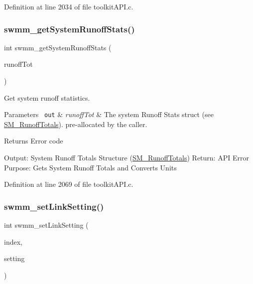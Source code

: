 Definition at line 2034 of file toolkit\+A\+P\+I.\+c.

\mbox{\label{group__tkfuncs_gabf3ea290e2af763289e18db435ea2ccd}} 
\subsubsection{\texorpdfstring{swmm\_getSystemRunoffStats()}{swmm\_getSystemRunoffStats()}}
{\footnotesize\ttfamily int swmm\+\_\+get\+System\+Runoff\+Stats (\begin{DoxyParamCaption}\item[{\mbox{\hyperlink{struct_s_m___runoff_totals}{S\+M\+\_\+\+Runoff\+Totals}} $\ast$}]{runoff\+Tot }\end{DoxyParamCaption})}



Get system runoff statistics. 


\begin{DoxyParams}[1]{Parameters}
\mbox{\texttt{ out}}  & {\em runoff\+Tot} & The system Runoff Stats struct (see \mbox{\hyperlink{struct_s_m___runoff_totals}{S\+M\+\_\+\+Runoff\+Totals}}). pre-\/allocated by the caller. \\
\hline
\end{DoxyParams}
\begin{DoxyReturn}{Returns}
Error code
\end{DoxyReturn}
Output\+: System Runoff Totals Structure (\mbox{\hyperlink{struct_s_m___runoff_totals}{S\+M\+\_\+\+Runoff\+Totals}}) Return\+: A\+PI Error Purpose\+: Gets System Runoff Totals and Converts Units 

Definition at line 2069 of file toolkit\+A\+P\+I.\+c.

\mbox{\label{group__tkfuncs_gab44d2b1c21a6f750b0ce4c48ba16be81}} 
\subsubsection{\texorpdfstring{swmm\_setLinkSetting()}{swmm\_setLinkSetting()}}
{\footnotesize\ttfamily int swmm\+\_\+set\+Link\+Setting (\begin{DoxyParamCaption}\item[{int}]{index,  }\item[{double}]{setting }\end{DoxyParamCaption})}



